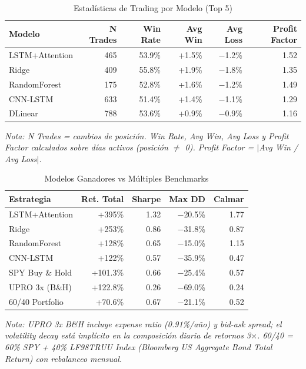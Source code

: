 \begin{table}[H]
\centering
\caption{Estad\'isticas de Trading por Modelo (Top 5)}
\label{tab:trading_stats}
\small
\begin{tabular}{@{}lrrrrr@{}}
\toprule
\textbf{Modelo} & \textbf{N Trades} & \textbf{Win Rate} & \textbf{Avg Win} & \textbf{Avg Loss} & \textbf{Profit Factor} \\
\midrule
LSTM+Attention & 465 & 53.9\% & +1.5\% & $-$1.2\% & 1.52 \\
Ridge & 409 & 55.8\% & +1.9\% & $-$1.8\% & 1.35 \\
RandomForest & 175 & 52.8\% & +1.6\% & $-$1.2\% & 1.49 \\
CNN-LSTM & 633 & 51.4\% & +1.4\% & $-$1.1\% & 1.29 \\
DLinear & 788 & 53.6\% & +0.9\% & $-$0.9\% & 1.16 \\
\bottomrule
\end{tabular}
\vspace{0.2cm}
\parbox{0.9\textwidth}{\footnotesize\textit{Nota: N Trades = cambios de posici\'on. Win Rate, Avg Win, Avg Loss y Profit Factor calculados sobre d\'ias activos (posici\'on $\neq$ 0). Profit Factor = $|$Avg Win / Avg Loss$|$.}}
\end{table}

\begin{table}[H]
\centering
\caption{Modelos Ganadores vs M\'ultiples Benchmarks}
\label{tab:benchmarks}
\begin{tabular}{@{}lrrrr@{}}
\toprule
\textbf{Estrategia} & \textbf{Ret. Total} & \textbf{Sharpe} & \textbf{Max DD} & \textbf{Calmar} \\
\midrule
LSTM+Attention & +395\% & 1.32 & $-$20.5\% & 1.77 \\
Ridge & +253\% & 0.86 & $-$31.8\% & 0.87 \\
RandomForest & +128\% & 0.65 & $-$15.0\% & 1.15 \\
CNN-LSTM & +122\% & 0.57 & $-$35.9\% & 0.47 \\
\midrule
SPY Buy \& Hold & +101.3\% & 0.66 & $-$25.4\% & 0.57 \\
UPRO 3x (B\&H) & +122.8\% & 0.26 & $-$69.0\% & 0.24 \\
60/40 Portfolio & +70.6\% & 0.67 & $-$21.1\% & 0.52 \\
\bottomrule
\end{tabular}
\vspace{0.2cm}
\parbox{0.9\textwidth}{\footnotesize\textit{Nota: UPRO 3x B\&H incluye \textit{expense ratio} (0.91\%/a\~no) y \textit{bid-ask spread}; el \textit{volatility decay} est\'a impl\'icito en la composici\'on diaria de retornos 3$\times$. 60/40 = 60\% SPY + 40\% LF98TRUU Index (Bloomberg US Aggregate Bond Total Return) con rebalanceo mensual.}}
\end{table}

